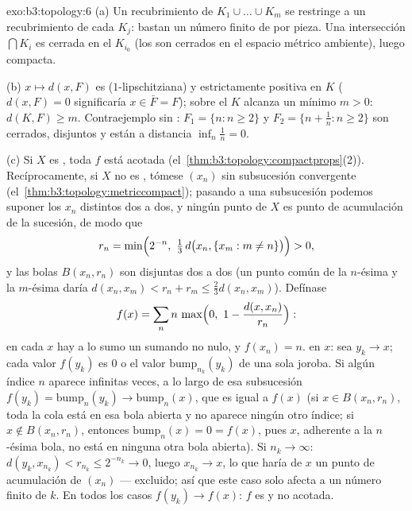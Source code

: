 \begin{solution}{exo:b3:topology:6}
(a) Un recubrimiento de $K_1 \cup \dots \cup K_m$ se restringe a un
recubrimiento de cada $K_j$: bastan un número finito de  por
pieza. Una intersección $\bigcap K_i$ es cerrada en el
 $K_{i_0}$ (los
 son cerrados en el espacio
métrico ambiente), luego compacta.

(b) $x \mapsto d(x, F)$ es 
($1$-lipschitziana) y estrictamente positiva en $K$ ($d(x, F) = 0$
significaría $x \in \bar F =
F$); sobre el  $K$ alcanza un
mínimo $m > 0$: $d(K, F)
\geq m$. Contraejemplo sin : $F_1 = \{n : n \geq
2\}$ y $F_2 = \{n + \frac1n : n \geq 2\}$ son cerrados, disjuntos y
están a distancia $\inf_n \frac1n = 0$.

(c) Si $X$ es , toda $f$
 está acotada
(el~\cref{thm:b3:topology:compactprops}(2)). Recíprocamente, si $X$ no
es , tómese $(x_n)$ sin
subsucesión convergente (el~\cref{thm:b3:topology:metriccompact});
pasando a una subsucesión podemos suponer los $x_n$ distintos dos a dos,
y ningún punto de $X$ es punto de acumulación de la sucesión, de modo
que
\[
r_n = \min\Bigl(2^{-n},\ \tfrac13\,d\bigl(x_n, \{x_m : m \neq
n\}\bigr)\Bigr) > 0,
\]
y las bolas $B(x_n, r_n)$ son disjuntas dos a dos (un punto común de la
$n$-ésima y la $m$-ésima daría $d(x_n, x_m) < r_n +
r_m \leq \frac23 d(x_n, x_m)$). Defínase
\[
f(x) = \sum_{n} n\,\max\Bigl(0,\ 1 - \frac{d(x,
x_n)}{r_n}\Bigr):
\]
en cada $x$ hay a lo sumo un sumando no nulo, y $f(x_n) = n$.
 en $x$: sea
$y_k \to x$; cada valor $f(y_k)$ es $0$ o el valor
$\mathrm{bump}_{n_k}(y_k)$ de una sola joroba. Si algún índice $n$
aparece infinitas veces, a lo largo de esa subsucesión
$f(y_k) = \mathrm{bump}_n(y_k) \to
\mathrm{bump}_n(x)$, que es igual a $f(x)$ (si $x \in B(x_n,
r_n)$, toda la cola está en esa bola abierta y no aparece ningún otro
índice; si $x \notin B(x_n, r_n)$, entonces
$\mathrm{bump}_n(x) = 0 = f(x)$, pues $x$, adherente a la $n$-ésima
bola, no está en ninguna otra bola abierta). Si $n_k \to \infty$:
$d(y_k, x_{n_k}) < r_{n_k} \leq 2^{-n_k} \to 0$, luego $x_{n_k}
\to x$, lo que haría de $x$ un punto de acumulación de $(x_n)$ ---
excluido; así que este caso solo afecta a un número finito de $k$. En
todos los casos $f(y_k) \to f(x)$: $f$ es
 y no acotada.
\end{solution}

